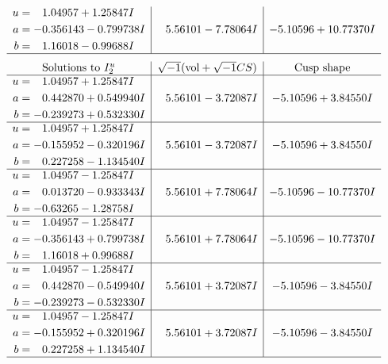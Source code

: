 \documentclass[1p]{elsarticle_modified}
\theoremstyle{definition}
\newcommand{\I}{\sqrt{-1}}
\begin{document}
$$\begin{array}{c|c|c}
\begin{aligned}
u &= \phantom{-}1.04957 + 1.25847 I \\
a &= -0.356143 - 0.799738 I \\
b &= \phantom{-}1.16018 - 0.99688 I\end{aligned}
 & \phantom{-}5.56101 - 7.78064 I & -5.10596 + 10.77370 I\\
 \hline 
 \end{array}$$\newpage$$\begin{array}{c|c|c}  
\text{Solutions to }I^u_{2}& \I (\text{vol} + \sqrt{-1}CS) & \text{Cusp shape}\\
 \hline 
\begin{aligned}
u &= \phantom{-}1.04957 + 1.25847 I \\
a &= \phantom{-}0.442870 + 0.549940 I \\
b &= -0.239273 + 0.532330 I\end{aligned}
 & \phantom{-}5.56101 - 3.72087 I & -5.10596 + 3.84550 I \\ \hline\begin{aligned}
u &= \phantom{-}1.04957 + 1.25847 I \\
a &= -0.155952 - 0.320196 I \\
b &= \phantom{-}0.227258 - 1.134540 I\end{aligned}
 & \phantom{-}5.56101 - 3.72087 I & -5.10596 + 3.84550 I \\ \hline\begin{aligned}
u &= \phantom{-}1.04957 - 1.25847 I \\
a &= \phantom{-}0.013720 - 0.933343 I \\
b &= -0.63265 - 1.28758 I\end{aligned}
 & \phantom{-}5.56101 + 7.78064 I & -5.10596 - 10.77370 I \\ \hline\begin{aligned}
u &= \phantom{-}1.04957 - 1.25847 I \\
a &= -0.356143 + 0.799738 I \\
b &= \phantom{-}1.16018 + 0.99688 I\end{aligned}
 & \phantom{-}5.56101 + 7.78064 I & -5.10596 - 10.77370 I \\ \hline\begin{aligned}
u &= \phantom{-}1.04957 - 1.25847 I \\
a &= \phantom{-}0.442870 - 0.549940 I \\
b &= -0.239273 - 0.532330 I\end{aligned}
 & \phantom{-}5.56101 + 3.72087 I & -5.10596 - 3.84550 I \\ \hline\begin{aligned}
u &= \phantom{-}1.04957 - 1.25847 I \\
a &= -0.155952 + 0.320196 I \\
b &= \phantom{-}0.227258 + 1.134540 I\end{aligned}
 & \phantom{-}5.56101 + 3.72087 I & -5.10596 - 3.84550 I\\
 \hline 
 \end{array}$$\newpage\newpage\renewcommand{\arraystretch}{1}
\end{document}
